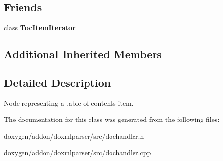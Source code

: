 \subsection*{Friends}
\begin{DoxyCompactItemize}
\item 
\mbox{\label{class_toc_item_handler_a15a328d9d360ffb0a16935e850e64c1b}} 
class {\bfseries Toc\+Item\+Iterator}
\end{DoxyCompactItemize}
\subsection*{Additional Inherited Members}


\subsection{Detailed Description}
Node representing a table of contents item. 



The documentation for this class was generated from the following files\+:\begin{DoxyCompactItemize}
\item 
doxygen/addon/doxmlparser/src/dochandler.\+h\item 
doxygen/addon/doxmlparser/src/dochandler.\+cpp\end{DoxyCompactItemize}
